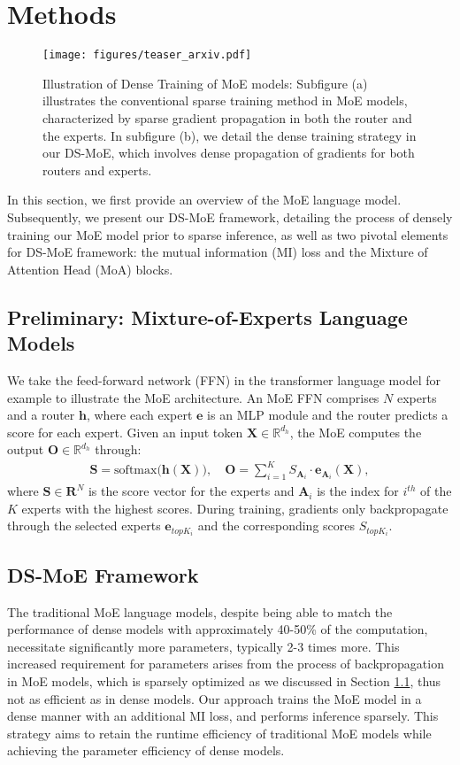 \section{Methods}
\vspace{-2mm}
\begin{figure*}
\centering
\texttt{[image: figures/teaser\_arxiv.pdf]}
\caption{Illustration of Dense Training of MoE models: Subfigure (a) illustrates the conventional sparse training method in MoE models, characterized by sparse gradient propagation in both the router and the experts. In subfigure (b), we detail the dense training strategy in our DS-MoE, which involves dense propagation of gradients for both routers and experts.}
\label{fig:method}
\end{figure*}
In this section, we first provide an overview of the MoE language model. Subsequently, we present our DS-MoE framework, detailing the process of densely training our MoE model prior to sparse inference, as well as two pivotal elements for DS-MoE framework: the mutual information (MI) loss and the Mixture of Attention Head (MoA) blocks.

\vspace{-2mm}
\subsection{Preliminary: Mixture-of-Experts Language Models} \label{sec:preliminary}
We take the feed-forward network (FFN) in the transformer language model for example to illustrate the MoE architecture. An MoE FFN comprises $N$ experts and a router $\mathbf{h}$, where each expert $\mathbf{e}$ is an MLP module and the router predicts a score for each expert. Given an input token $\mathbf{X}\in \mathbb{R}^{d_h}$, the MoE computes the output $\mathbf{O}\in \mathbb{R}^{d_h}$ through:
\begin{align}
     \mathbf{S} = \mathrm{softmax}\big(\mathbf{h(X)}\big), \quad
     \mathbf{O} = \sum_{i=1}^{K}S_{\mathbf{A}_i}\cdot\mathbf{e}_{\mathbf{A}_i}\mathbf{(X)},
\end{align}
where $\mathbf{S}\in \mathbf{R}^N$ is the score vector for the experts and $\mathbf{A}_i$ is the index for $i^{th}$ of the $K$ experts with the highest scores. During training, gradients only backpropagate through the selected experts $\mathbf{e}_{topK_i}$ and the corresponding scores $S_{topK_i}$. 

\subsection{DS-MoE Framework}
The traditional MoE language models, despite being able to match the performance of dense models with approximately 40-50\% of the computation, necessitate significantly more parameters, typically 2-3 times more. This increased requirement for parameters arises from the process of backpropagation in MoE models, which is sparsely optimized as we discussed in Section \ref{sec:preliminary}, thus not as efficient as in dense models. Our approach trains the MoE model in a dense manner with an additional MI loss, and performs inference sparsely. This strategy aims to retain the runtime efficiency of traditional MoE models while achieving the parameter efficiency of dense models.

